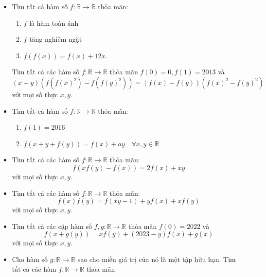 \documentclass[11pt]{scrartcl}
\begin{document}
\begin{itemize}[label=, leftmargin=0em, itemsep=-0em]
\begin{btvn}
    \end{btvn}
    \item \begin{btvn}Tìm tất cả hàm số $f:\mathbb{R} \to \mathbb{R}$ thỏa mãn:
    \begin{enumerate}
        \item $f$ là hàm toàn ánh
        \item $f$ tăng nghiêm ngặt
        \item $f(f(x))=f(x)+12x.$
    \end{enumerate}      
    \end{btvn}
    \begin{btvn}Tìm tất cả các hàm số $f:\mathbb{R}\rightarrow\mathbb{R}$ thỏa mãn $f(0)=0,f(1)=2013$ và 
        \[(x-y)(f(f(x)^2)-f(f(y)^2))=(f(x)-f(y))(f(x)^2-f(y)^2)\]
        với mọi số thực $x,y$.
    \end{btvn}
    \item \begin{btvn} Tìm tất cả hàm số $f:\mathbb{R} \to \mathbb{R}$ thỏa mãn:
        \begin{enumerate}
            \item $f(1) = 2016$
            \item $f(x+y+f(y))=f(x)+ay\quad\forall x,y\in\mathbb{R}$
        \end{enumerate}      
    \end{btvn}
    \item \begin{btvn} Tìm tất cả các hàm số $f:\mathbb{R} \to \mathbb{R}$ thỏa mãn:
        $$f(xf(y)-f(x))=2f(x)+xy$$
    với mọi số thực $x,y$.
    \end{btvn}
    \item \begin{btvn} Tìm tất cả các hàm số $f:\mathbb{R} \to \mathbb{R}$ thỏa mãn:
        \[f(x)f(y)=f(xy-1)+yf(x)+xf(y)\]
    với mọi số thực $x,y$.
    \end{btvn}
    \item \begin{btvn} Tìm tất cả các cặp hàm số $f,g:\mathbb{R} \to \mathbb{R}$ thỏa mãn $f(0) = 2022$ và
        \[f (x+g(y)) =xf(y)+(2023-y)f(x)+g(x)\]
    với mọi số thực $x,y$.
    \end{btvn}
    \item \begin{btvn}
        Cho hàm số $g \colon \mathbb{R} \to \mathbb{R}$ sao cho miền giá trị của nó là một tập hữu hạn. Tìm tất cả các hàm $f \colon \mathbb{R} \to \mathbb{R}$ thỏa mãn

\end{btvn}
\end{itemize}
\end{document}
